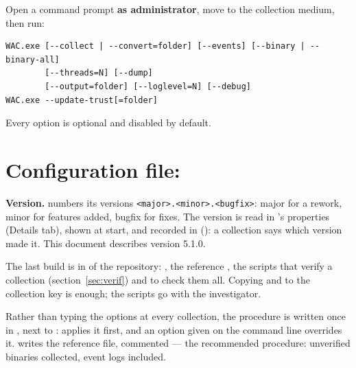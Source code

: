 \documentclass[11pt,a4paper,oneside]{report}
\begin{document}
Open a command prompt \textbf{as administrator}, move to the collection medium,
then run:

\begin{lstlisting}
WAC.exe [--collect | --convert=folder] [--events] [--binary | --binary-all]
        [--threads=N] [--dump]
        [--output=folder] [--loglevel=N] [--debug]
WAC.exe --update-trust[=folder]
\end{lstlisting}

Every option is optional and disabled by default.

\section{Configuration file: }

\textbf{Version.} \wac{} numbers its versions \texttt{<major>.<minor>.<bugfix>}:
major for a rework, minor for features added, bugfix for fixes. The version
is read in 's properties (Details tab), shown at start, and
recorded in  (): a collection
says which version made it. This document describes version 5.1.0.

The last build is in  of the repository: ,
the reference , the scripts that verify a collection
(section~\ref{sec:verif}) and  to check them all.
Copying  and  to the collection key is
enough; the scripts go with the investigator.

Rather than typing the options at every collection, the procedure is written
once in , next to : \wac{} applies it
first, and an option given on the command line overrides it.
 writes the reference file, commented — the recommended
procedure: unverified binaries collected, event logs included.
\end{document}
